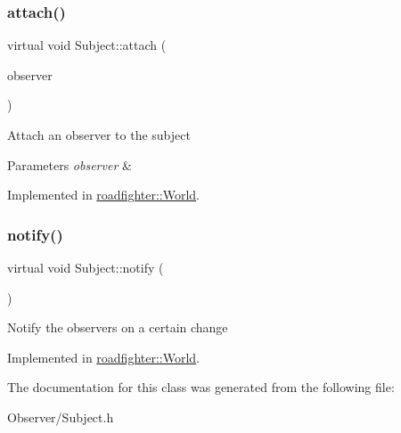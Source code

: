 \subsubsection{\texorpdfstring{attach()}{attach()}}
{\footnotesize\ttfamily virtual void Subject\+::attach (\begin{DoxyParamCaption}\item[{std\+::shared\+\_\+ptr$<$ \hyperlink{classObserver}{Observer} $>$}]{observer }\end{DoxyParamCaption})\hspace{0.3cm}{\ttfamily [pure virtual]}}

Attach an observer to the subject 
\begin{DoxyParams}{Parameters}
{\em observer} & \\
\hline
\end{DoxyParams}


Implemented in \hyperlink{classroadfighter_1_1World_aae11d52bce048722267d7d0515c69985}{roadfighter\+::\+World}.

\mbox{\label{classSubject_aedd8aa6de28b18ef5880566de4294bfe}} 
\subsubsection{\texorpdfstring{notify()}{notify()}}
{\footnotesize\ttfamily virtual void Subject\+::notify (\begin{DoxyParamCaption}{ }\end{DoxyParamCaption})\hspace{0.3cm}{\ttfamily [pure virtual]}}

Notify the observers on a certain change 

Implemented in \hyperlink{classroadfighter_1_1World_ad2edbd8e41dfbc65c99500512f954940}{roadfighter\+::\+World}.



The documentation for this class was generated from the following file\+:\begin{DoxyCompactItemize}
\item 
Observer/Subject.\+h\end{DoxyCompactItemize}
